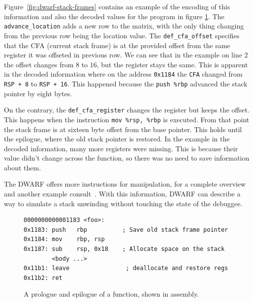 Figure~\ref{fig:dwarf-stack-frames} contains an example of the encoding of this
information and also the decoded values for the program in figure
\ref{fig:prologue-and-epilogue}. The \texttt{advance\_location} adds a new row
to the matrix, with the only thing changing from the previous row being the
location value. The \texttt{def\_cfa\_offset} specifies that the CFA (current
stack frame) is at the provided offset from the same register it was offseted
in previous row. We can see that in the example on line $2$ the offset changes
from $8$ to $16$, but the register stays the same. This is apparent in the
decoded information where on the address \texttt{0x1184} the \texttt{CFA}
changed from \texttt{RSP + 8} to \texttt{RSP + 16}. This happened because
the \texttt{push \%rbp} advanced the stack pointer by eight bytes.

On the contrary, the \texttt{def\_cfa\_register} changes the register but keeps
the offset. This happens when the instruction \texttt{mov \%rsp, \%rbp} is
executed. From that point the stack frame is at sixteen byte offset from the
base pointer. This holds until the epilogue, where the old stack pointer is
restored. In the example in the decoded information, many more registers were
missing. This is because their value didn't change across the function, so
there was no need to save information about them.

The DWARF offers more instructions for manipulation, for a complete overview
and another example consult~\cite{dwarf}. With this information, DWARF can
describe a way to simulate a stack unwinding without touching the state of the
debuggee.

\begin{figure}
    \begin{lstlisting}
0000000000001183 <foo>:
0x1183:	push   rbp          ; Save old stack frame pointer
0x1184:	mov    rbp, rsp     
0x1187:	sub    rsp, 0x18    ; Allocate space on the stack
        <body ...>
0x11b1:	leave                ; deallocate and restore regs
0x11b2:	ret
    \end{lstlisting}
    \caption{A prologue and epilogue of a function, shown in assembly.}
    \label{fig:prologue-and-epilogue}
\end{figure}


